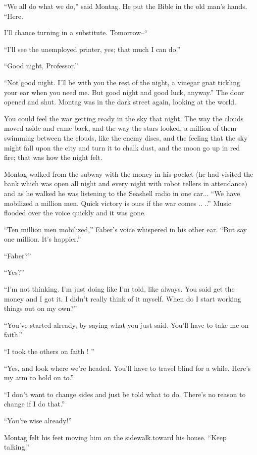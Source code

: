 \documentclass[11pt,openany]{book}
\begin{document}
``We all do what we do,'' said Montag. He put the Bible in the old man's hands. ``Here.

I'll chance turning in a substitute. Tomorrow--``

``I'll see the unemployed printer, yes; that much I can do.''

``Good night, Professor.''

``Not good night. I'll be with you the rest of the night, a vinegar gnat tickling your ear when you need me. But good night and good luck, anyway.'' The door opened and shut. Montag was in the dark street again, looking at the world.

You could feel the war getting ready in the sky that night. The way the clouds moved aside and came back, and the way the stars looked, a million of them swimming between the clouds, like the enemy discs, and the feeling that the sky might fall upon the city and turn it to chalk dust, and the moon go up in red fire; that was how the night felt.

Montag walked from the subway with the money in his pocket (he had visited the bank which was open all night and every night with robot tellers in attendance) and as he walked he was listening to the Seashell radio in one car... ``We have mobilized a million men. Quick victory is ours if the war comes .. ..'' Music flooded over the voice quickly and it was gone.

``Ten million men mobilized,'' Faber's voice whispered in his other ear. ``But say one million. It's happier.''

``Faber?''

``Yes?''

``I'm not thinking. I'm just doing like I'm told, like always. You said get the money and I got it. I didn't really think of it myself. When do I start working things out on my own?''

``You've started already, by saying what you just said. You'll have to take me on faith.''

``I took the others on faith ! ''

``Yes, and look where we're headed. You'll have to travel blind for a while. Here's my arm to hold on to.''

``I don't want to change sides and just be told what to do. There's no reason to change if I do that.''

``You're wise already!''

Montag felt his feet moving him on the sidewalk.toward his house. ``Keep talking.''
\end{document}
